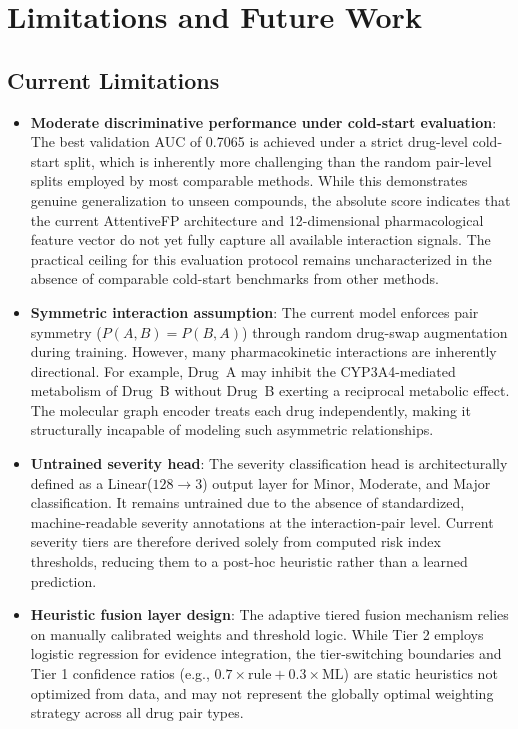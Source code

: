 \documentclass[conference]{IEEEtran}
\begin{document}
\section{Limitations and Future Work}

\subsection{Current Limitations}
\begin{itemize}
    \item \textbf{Moderate discriminative performance under cold-start evaluation}: The best validation AUC of 0.7065 is achieved under a strict drug-level cold-start split, which is inherently more challenging than the random pair-level splits employed by most comparable methods. While this demonstrates genuine generalization to unseen compounds, the absolute score indicates that the current AttentiveFP architecture and 12-dimensional pharmacological feature vector do not yet fully capture all available interaction signals. The practical ceiling for this evaluation protocol remains uncharacterized in the absence of comparable cold-start benchmarks from other methods.

    \item \textbf{Symmetric interaction assumption}: The current model enforces pair symmetry ($P(A,B) = P(B,A)$) through random drug-swap augmentation during training. However, many pharmacokinetic interactions are inherently directional. For example, Drug~A may inhibit the CYP3A4-mediated metabolism of Drug~B without Drug~B exerting a reciprocal metabolic effect. The molecular graph encoder treats each drug independently, making it structurally incapable of modeling such asymmetric relationships.

    \item \textbf{Untrained severity head}: The severity classification head is architecturally defined as a Linear($128 \rightarrow 3$) output layer for Minor, Moderate, and Major classification. It remains untrained due to the absence of standardized, machine-readable severity annotations at the interaction-pair level. Current severity tiers are therefore derived solely from computed risk index thresholds, reducing them to a post-hoc heuristic rather than a learned prediction.

    \item \textbf{Heuristic fusion layer design}: The adaptive tiered fusion mechanism relies on manually calibrated weights and threshold logic. While Tier 2 employs logistic regression for evidence integration, the tier-switching boundaries and Tier 1 confidence ratios (e.g., $0.7 \times \text{rule} + 0.3 \times \text{ML}$) are static heuristics not optimized from data, and may not represent the globally optimal weighting strategy across all drug pair types.


\end{itemize}
\end{document}
